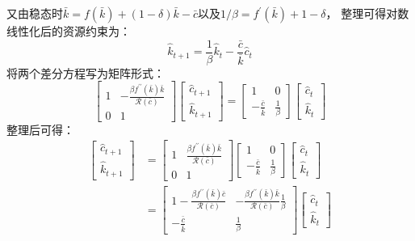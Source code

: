 又由稳态时$\bar{k} = f(\bar{k})+(1-\delta)\bar{k}-\bar{c}$以及$1/\beta = f^{\prime}(\bar{k})+1-\delta$，
整理可得对数线性化后的资源约束为：
\begin{equation}
    \hat{k}_{t+1} = \frac{1}{\beta}\hat{k}_t - \frac{\bar{c}}{\bar{k}}\hat{c}_t
\end{equation}
将两个差分方程写为矩阵形式：
\[
    \begin{bmatrix}
        1 & -\frac{\beta f^{\prime \prime}(\bar{k}) \bar{k}}{\mathcal{R}(\bar{c})} \\
        0 & 1
    \end{bmatrix}
    \begin{bmatrix}
        \hat{c}_{t+1} \\
        \hat{k}_{t+1}
    \end{bmatrix}
    =
    \begin{bmatrix}
        1 & 0 \\
        -\frac{\bar{c}}{\bar{k}} & \frac{1}{\beta}
    \end{bmatrix}
    \begin{bmatrix}
        \hat{c}_{t} \\
        \hat{k}_{t}
    \end{bmatrix}
\]
整理后可得：
\[
    \begin{aligned}
        \begin{bmatrix}
            \hat{c}_{t+1} \\
            \hat{k}_{t+1}
        \end{bmatrix}
        &=
        \begin{bmatrix}
            1 & \frac{\beta f^{\prime \prime}(\bar{k}) \bar{k}}{\mathcal{R}(\bar{c})} \\
            0 & 1
        \end{bmatrix}
        \begin{bmatrix}
            1 & 0 \\
            -\frac{\bar{c}}{\bar{k}} & \frac{1}{\beta}
        \end{bmatrix}
        \begin{bmatrix}
            \hat{c}_{t} \\
            \hat{k}_{t}
        \end{bmatrix}   \\
        &=
        \begin{bmatrix}
            1-\frac{\beta f^{\prime \prime}(\bar{k}) \bar{c}}{\mathcal{R}(\bar{c})} &
            - \frac{\beta f^{\prime \prime}(\bar{k}) \bar{k}}{\mathcal{R}(\bar{c})} \frac{1}{\beta} \\
            -\frac{\bar{c}}{\bar{k}} & \frac{1}{\beta}
        \end{bmatrix}
        \begin{bmatrix}
            \hat{c}_{t} \\
            \hat{k}_{t}
        \end{bmatrix}
    \end{aligned}
\]
